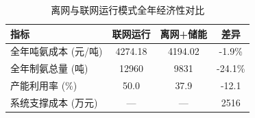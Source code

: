 \begin{table}[H]
\centering
\caption{离网与联网运行模式全年经济性对比}
\begin{tabular}{lccc}
\toprule
指标 & 联网运行 & 离网+储能 & 差异 \\
\midrule
全年吨氨成本 (元/吨) & 4274.18 & 4194.02 & -1.9\% \\
全年制氨总量 (吨) & 12960 & 9831 & -24.1\% \\
产能利用率 (\%) & 50.0 & 37.9 & -12.1 \\
系统支撑成本 (万元) & — & — & 2516 \\
\bottomrule
\end{tabular}
\end{table}